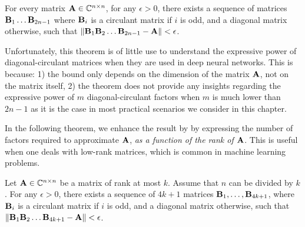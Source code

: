 \begin{theorem} \label{theorem:huhtanen}
  For every matrix $\mathbf{A} \in {\ensuremath \mathbb{C}}^{n \times n}$, for any $\epsilon > 0$, there exists a sequence of matrices $\mathbf{B}_1 \ldots \mathbf{B}_{2n-1}$ where $\mathbf{B}_{i}$ is a circulant matrix if $i$ is odd, and a diagonal matrix otherwise, such that $\norm{\mathbf{B}_{1} \mathbf{B}_{2} \ldots \mathbf{B}_{2n-1} - \mathbf{A}} < \epsilon$.
\end{theorem}

Unfortunately, this theorem is of little use to understand the expressive power of diagonal-circulant matrices when they are used in deep neural networks.
This is because: 1) the bound only depends on the dimension of the matrix $\mathbf{A}$, not on the matrix itself, 2) the theorem does not provide any insights regarding the expressive power of $m$ diagonal-circulant factors when $m$ is much lower than $2n - 1$ as it is the case in most practical scenarios we consider in this chapter. 

In the following theorem, we enhance the result by \citet{Huhtanen2015} by expressing the number of factors required to approximate $\mathbf{A}$, \emph{as a function of the rank of $\mathbf{A}$}.
This is useful when one deals with low-rank matrices, which is common in machine learning problems. 

\begin{theorem} \label{theorem:rank-decomposition}
Let $\mathbf{A} \in {\ensuremath \mathbb{C}}^{n \times n}$ be a matrix of rank at most $k$.
Assume that $n$ can be divided by $k$.
For any $\epsilon > 0$, there exists a sequence of $4k+1$ matrices $\mathbf{B}_{1}, \ldots, \mathbf{B}_{4k+1}$, where $\mathbf{B}_{i}$ is a circulant matrix if $i$ is odd, and a diagonal matrix otherwise, such that $\norm{\mathbf{B}_1 \mathbf{B}_2 \ldots \mathbf{B}_{4k+1} - \mathbf{A}} < \epsilon$.
\end{theorem}

